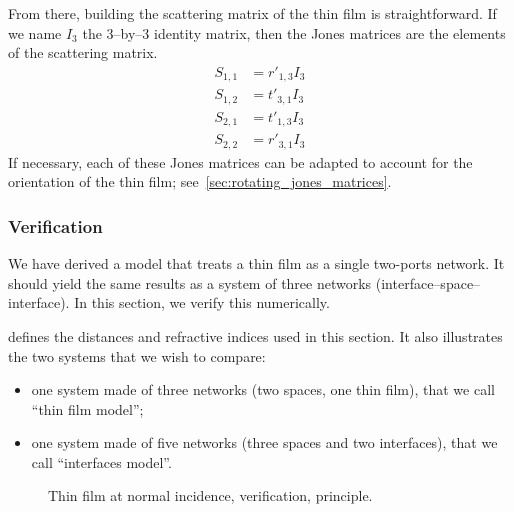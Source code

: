 From there, building the scattering matrix of the thin film is straightforward.
If we name $I_3$ the 3--by--3 identity matrix,
then the Jones matrices  
are the elements of the scattering matrix.
\begin{subequations}
    \begin{align}
        S_{1, 1} &= r'_{1, 3} I_3 \label{eq:thin_film_normal_s11} \\
        S_{1, 2} &= t'_{3, 1} I_3 \label{eq:thin_film_normal_s12} \\
        S_{2, 1} &= t'_{1, 3} I_3 \label{eq:thin_film_normal_s21} \\
        S_{2, 2} &= r'_{3, 1} I_3 \label{eq:thin_film_normal_s22}
    \end{align}
    \label{eq:thin_film_normal_sij}
\end{subequations}
If necessary, each of these Jones matrices can be adapted to account for the orientation of the thin film;
see~\vref{sec:rotating_jones_matrices}.

\subsubsection{Verification}
We have derived a model that treats a thin film as a single two-ports network.
It should yield the same results as a system of three networks
(interface--space--interface).
In this section, we verify this numerically.

 defines the distances and refractive indices used in this section.
It also illustrates the two systems that we wish to compare:
\begin{itemize}
    \item one system made of three networks (two spaces, one thin film), that we call ``thin film model'';
    \item one system made of five networks (three spaces and two interfaces), that we call ``interfaces model''.
\end{itemize}
\begin{figure}[hbtp]
    \centering
    
    \caption{Thin film at normal incidence, verification, principle.}
    \label{fig:thin_film_normal_verification_principle}
\end{figure}

